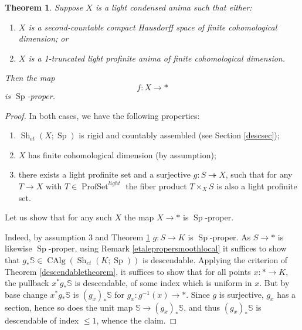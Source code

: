\documentclass[12pt]{article}
\newtheorem{theorem}{Theorem}[section]
\newcommand{\on}{\operatorname}
\begin{document}
\begin{theorem}\label{chausproper}
Suppose $X$ is a light condensed anima such that either:
\begin{enumerate}
\item $X$ is a second-countable compact Hausdorff space of finite cohomological dimension; or
\item $X$ is a 1-truncated light profinite anima of finite cohomological dimension.
\end{enumerate}

Then the map
$$f:X\to \ast$$
is $\on{Sp}$-proper.

\end{theorem}\label{moreproper}
\begin{proof}
In both cases, we have the following properties:
\begin{enumerate}
\item $\on{Sh}_{et}(X;\on{Sp})$ is rigid and countably assembled (see Section \ref{descsec});
\item $X$ has finite cohomological dimension (by assumption);
\item there exists a light profinite set and a surjective $g:S\twoheadrightarrow X$, such that for any $T\to X$ with $T\in\on{ProfSet}^{light}$ the fiber product $T\times_X S$ is also a light profinite set.
\end{enumerate}
Let us show that for any such $X$ the map $X\to \ast$ is $\on{Sp}$-proper.

Indeed, by assumption 3 and Theorem \ref{chausproper} $g:S\to K$ is $\on{Sp}$-proper.  As $S\to \ast$ is likewise $\on{Sp}$-proper, using Remark \ref{etalepropersmoothlocal} it suffices to show that $g_\ast\mathbb{S}\in\on{CAlg}(\on{Sh}_{et}(K;\on{Sp}))$ is descendable.  Applying the criterion of Theorem \ref{descendabletheorem}, it suffices to show that for all points $x:\ast\to K$, the pullback $x^\ast g_\ast \mathbb{S}$ is descendable, of some index which is uniform in $x$.  But by base change $x^\ast g_\ast\mathbb{S}$ is $(g_x)_\ast\mathbb{S}$ for $g_x:g^{-1}(x)\to \ast$.  Since $g$ is surjective, $g_x$ has a section, hence so does the unit map $\mathbb{S}\to (g_x)_\ast\mathbb{S}$, and thus $(g_x)_\ast\mathbb{S}$ is descendable of index $\leq 1$, whence the claim.
\end{proof}
\end{document}
